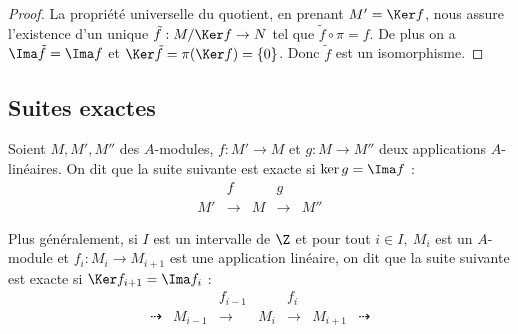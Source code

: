 \begin{proof}
 La propriété universelle du quotient, en prenant $M'=\Ker f$, nous assure
l'existence d'un unique $\tilde{f} : M/\Ker f \rightarrow N$ tel que
$\tilde{f}\circ \pi = f$. De plus on a $\Ima\tilde{f} = \Ima f$ et
$\Ker\tilde{f} = \pi(\Ker f) = \{0\}$. Donc $\tilde{f}$ est un isomorphisme.
\end{proof}

\subsection{Suites exactes}
\vspace{0.5em}

\begin{defi}
 
 Soient $M,M',M''$ des $A$-modules, $f : M' \rightarrow M$ et $g : M\rightarrow
M''$ deux applications $A$-linéaires. On dit que la suite suivante est exacte
si $\ker g = \Ima f$ :
\begin{displaymath}\begin{array}{ccccc}
   & f             &   & g              &    \\
 M'&\longrightarrow& M &\longrightarrow &M''
 \end{array} \end{displaymath}

Plus généralement, si $I$ est un intervalle de $\Z$ et pour tout $i\in I,\ M_i$
est un $A$-module et $f_i : M_i \rightarrow M_{i+1}$ est une application
linéaire, on dit que la suite suivante est exacte si $\Ker f_{i+1} = \Ima
f_i$ :
\begin{displaymath}\begin{array}{ccccccc}
                &       & f_{i-1}       &     & f_i            &       & \\
 \dashrightarrow&M_{i-1}&\longrightarrow& M_i &\longrightarrow &M_{i+1}&
\dashrightarrow
 \end{array} \end{displaymath}
\end{defi}

